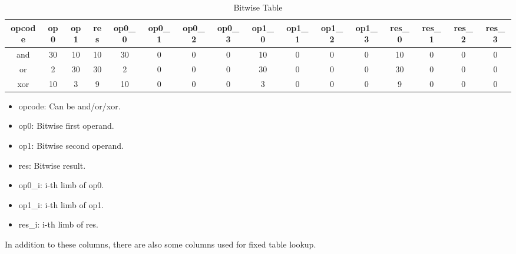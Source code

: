  \label{sec:bitwise-table}
\begin{table}[!ht]
    \centering
    \begin{adjustwidth}{-1cm}{}
        \begin{tabular}{|c|c|c|c|c|c|c|c|c|c|c|c|c|c|c|c|}
            \hline
            \rowcolor{gray} opcode & op0 & op1 & res & op0\_0 & op0\_1 & op0\_2 & op0\_3 & op1\_0 & op1\_1 & op1\_2 & op1\_3 & res\_0 & res\_1 & res\_2 & res\_3 \\
            \hline
            and                    & 30  & 10  & 10  & 30     & 0      & 0      & 0      & 10     & 0      & 0      & 0      & 10     & 0      & 0      & 0      \\
            \hline
            or                     & 2   & 30  & 30  & 2      & 0      & 0      & 0      & 30     & 0      & 0      & 0      & 30     & 0      & 0      & 0      \\
            \hline
            xor                    & 10  & 3   & 9   & 10     & 0      & 0      & 0      & 3      & 0      & 0      & 0      & 9      & 0      & 0      & 0      \\
            \hline
        \end{tabular}
    \end{adjustwidth}
    \caption{Bitwise Table}
    \label{table:bitwise-table}
\end{table}
\begin{itemize}
    \item opcode: Can be and/or/xor.
    \item op0: Bitwise first operand.
    \item op1: Bitwise second operand.
    \item res: Bitwise result.
    \item op0\_i: i-th limb of op0.
    \item op1\_i: i-th limb of op1.
    \item res\_i: i-th limb of res.
\end{itemize}

In addition to these columns, there are also some columns used for fixed table lookup.